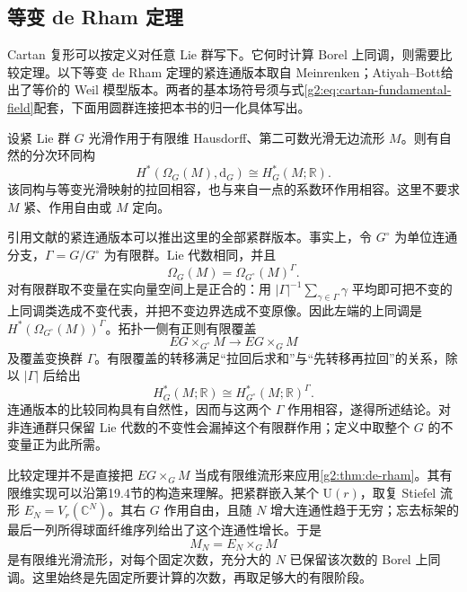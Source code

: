 \subsection{等变 de Rham 定理}
\label{g2:subsec:C01:05}

Cartan 复形可以按定义对任意 Lie 群写下。它何时计算 Borel 上同调，则需要比较定理。以下等变 de Rham 定理的紧连通版本取自 Meinrenken\cite[\S6, Theorem 6.1]{Meinrenken2006EquivariantCartan}；Atiyah--Bott\cite[\S4, Theorem 4.13]{AtiyahBott1984MomentMap}给出了等价的 Weil 模型版本。两者的基本场符号须与式\eqref{g2:eq:cartan-fundamental-field}配套，下面用圆群连接把本书的归一化具体写出。

\begin{theorem}[等变 de Rham 定理]\label{g2:thm:equivariant-de-rham}
	设紧 Lie 群 \(G\) 光滑作用于有限维 Hausdorff、第二可数光滑无边流形 \(M\)。则有自然的分次环同构
	\[
		H^*(\Omega_G(M),\mathrm d_G)\cong H_G^*(M;\mathbb R).
	\]
	该同构与等变光滑映射的拉回相容，也与来自一点的系数环作用相容。这里不要求 \(M\) 紧、作用自由或 \(M\) 定向。
\end{theorem}

引用文献的紧连通版本可以推出这里的全部紧群版本。事实上，令 \(G^\circ\) 为单位连通分支，\(\Gamma=G/G^\circ\) 为有限群。Lie 代数相同，并且
\[
	\Omega_G(M)=\Omega_{G^\circ}(M)^\Gamma.
\]
对有限群取不变量在实向量空间上是正合的：用 \(|\Gamma|^{-1}\sum_{\gamma\in\Gamma}\gamma\) 平均即可把不变的上同调类选成不变代表，并把不变边界选成不变原像。因此左端的上同调是 \(H^*(\Omega_{G^\circ}(M))^\Gamma\)。拓扑一侧有正则有限覆盖
\[
	EG\times_{G^\circ}M\longrightarrow EG\times_G M
\]
及覆盖变换群 \(\Gamma\)。有限覆盖的转移满足“拉回后求和”与“先转移再拉回”的关系，除以 \(|\Gamma|\) 后给出
\[
	H_G^*(M;\mathbb R)\cong H_{G^\circ}^*(M;\mathbb R)^\Gamma.
\]
连通版本的比较同构具有自然性，因而与这两个 \(\Gamma\) 作用相容，遂得所述结论。对非连通群只保留 Lie 代数的不变性会漏掉这个有限群作用；定义中取整个 \(G\) 的不变量正为此所需。

\ProseParagraphBreak
比较定理并不是直接把 \(EG\times_G M\) 当成有限维流形来应用\cref{g2:thm:de-rham}。其有限维实现可以沿第19.4节的构造来理解。把紧群嵌入某个 \(\mathrm U(r)\)，取复 Stiefel 流形 \(E_N=V_r(\mathbb C^N)\)。其右 \(G\) 作用自由，且随 \(N\) 增大连通性趋于无穷；忘去标架的最后一列所得球面纤维序列给出了这个连通性增长。于是
\[
	M_N=E_N\times_G M
\]
是有限维光滑流形，对每个固定次数，充分大的 \(N\) 已保留该次数的 Borel 上同调。这里始终是先固定所要计算的次数，再取足够大的有限阶段。

